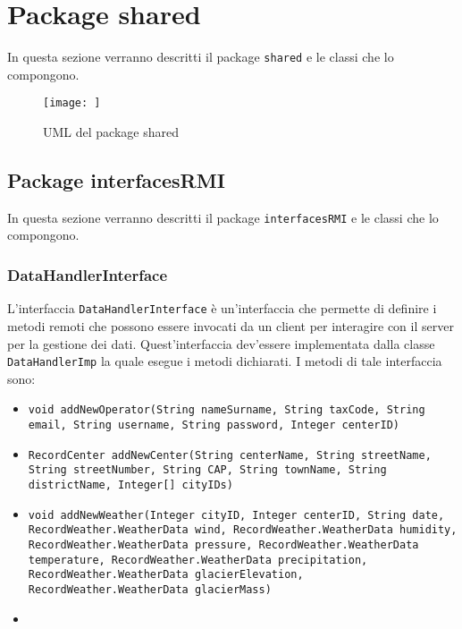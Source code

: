 \section{Package shared}
In questa sezione verranno descritti il package \texttt{shared} e le classi che lo compongono.\\

\begin{figure}[H]
    \centering
    \texttt{[image: ]}
    \caption{UML del package shared}
    \label{fig:Server}
\end{figure}

\subsection{Package interfacesRMI} 
In questa sezione verranno descritti il package \texttt{interfacesRMI} e le classi che lo compongono.\\

\subsubsection{DataHandlerInterface}
L'interfaccia \texttt{DataHandlerInterface} è un'interfaccia che permette di definire i metodi remoti che possono
essere invocati da un client per interagire con il server per la gestione dei dati.
Quest'interfaccia dev'essere implementata dalla classe \texttt{DataHandlerImp} la quale esegue i metodi dichiarati.
I metodi di tale interfaccia sono:
\begin{itemize}
\item \texttt{void addNewOperator(String nameSurname, String taxCode, String email, String username, String password, Integer centerID)}
\item \texttt{RecordCenter addNewCenter(String centerName, String streetName, String streetNumber, String CAP, String townName, String districtName, Integer[] cityIDs)}
\item \texttt{void addNewWeather(Integer cityID, Integer centerID, String date, RecordWeather.WeatherData wind, RecordWeather.WeatherData humidity, RecordWeather.WeatherData pressure, RecordWeather.WeatherData temperature, RecordWeather.WeatherData precipitation, RecordWeather.WeatherData glacierElevation, RecordWeather.WeatherData glacierMass)}
\item {}
\end{itemize}

